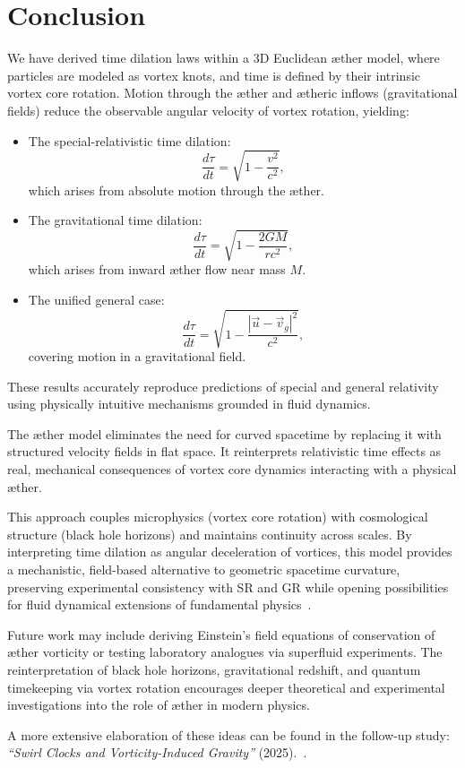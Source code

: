 
\section{Conclusion}

We have derived time dilation laws within a 3D Euclidean æther model, where particles are modeled as vortex knots, and time is defined by their intrinsic vortex core rotation. Motion through the æther and ætheric inflows (gravitational fields) reduce the observable angular velocity of vortex rotation, yielding:

\begin{itemize}
    \item The special-relativistic time dilation:
    \[
    \frac{d\tau}{dt} = \sqrt{1 - \frac{v^2}{c^2}},
    \]
    which arises from absolute motion through the æther.
    
    \item The gravitational time dilation:
    \[
    \frac{d\tau}{dt} = \sqrt{1 - \frac{2GM}{rc^2}},
    \]
    which arises from inward æther flow near mass $M$.
    
    \item The unified general case:
    \[
    \frac{d\tau}{dt} = \sqrt{1 - \frac{|\vec{u} - \vec{v}_g|^2}{c^2}},
    \]
    covering motion in a gravitational field.
\end{itemize}

These results accurately reproduce predictions of special and general relativity using physically intuitive mechanisms grounded in fluid dynamics.

The æther model eliminates the need for curved spacetime by replacing it with structured velocity fields in flat space. It reinterprets relativistic time effects as real, mechanical consequences of vortex core dynamics interacting with a physical æther.

This approach couples microphysics (vortex core rotation) with cosmological structure (black hole horizons) and maintains continuity across scales. By interpreting time dilation as angular deceleration of vortices, this model provides a mechanistic, field-based alternative to geometric spacetime curvature, preserving experimental consistency with SR and GR while opening possibilities for fluid dynamical extensions of fundamental physics~\cite{Winterberg2002-PlanckÆther,Schiller2022-maxforce}.

Future work may include deriving Einstein’s field equations of conservation of æther vorticity or testing laboratory analogues via superfluid experiments. The reinterpretation of black hole horizons, gravitational redshift, and quantum timekeeping via vortex rotation encourages deeper theoretical and experimental investigations into the role of æther in modern physics.

A more extensive elaboration of these ideas can be found in the follow-up study: \textit{“Swirl Clocks and Vorticity-Induced Gravity” } (2025).~\cite{vam2025unified}.